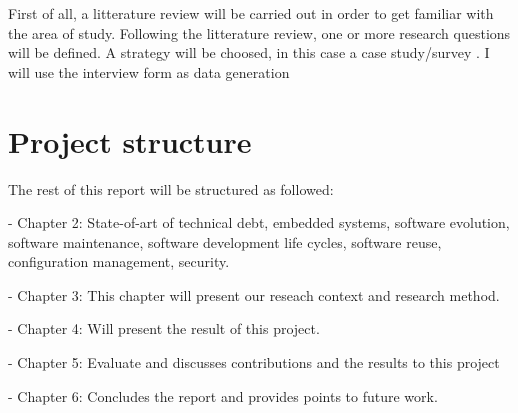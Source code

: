 First of all, a litterature review will be carried out in order to get familiar with the area of study. Following the litterature review, one or more research questions will be defined. A strategy will be choosed, in this case a case study/survey
. I will use the interview form as data generation

\section{Project structure}
The rest of this report will be structured as followed:

- Chapter 2: State-of-art of technical debt, embedded systems, software evolution, software maintenance, software development life cycles, software reuse, configuration management, security.

- Chapter 3: This chapter will present our reseach context and research method. 

- Chapter 4: Will present the result of this project.

- Chapter 5: Evaluate and discusses contributions and the results to this project

- Chapter 6: Concludes the report and provides points to future work. 
